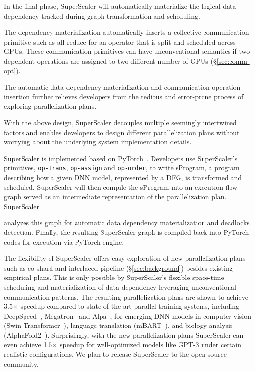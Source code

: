 In the final phase, {SuperScaler} will automatically materialize the logical data dependency tracked during graph transformation and scheduling. 

The dependency materialization automatically inserts a collective communication primitive such as all-reduce for an operator that is split and scheduled across GPUs. These communication primitives can have unconventional semantics if two dependent operations are assigned to two different number of GPUs (\S\ref{sec:comm-opt}).

The automatic data dependency materialization and communication operation insertion further relieves developers from the tedious and error-prone process of exploring parallelization plans. 

With the above design, {SuperScaler} decouples multiple seemingly intertwined factors and enables developers to design different parallelization plans without worrying about the underlying system implementation details.

{SuperScaler} is implemented based on PyTorch~\cite{PyTorch}. Developers use {SuperScaler}'s primitives, \texttt{op-trans}, \texttt{op-assign} and \texttt{op-order}, to write {sProgram}, a program describing how a given DNN model, represented by a DFG, is transformed and scheduled. {SuperScaler} will then compile the {sProgram} into an execution flow graph served as an intermediate representation of the parallelization plan. {SuperScaler} 

analyzes this graph for automatic data dependency materialization and deadlocks detection. Finally, the resulting {SuperScaler} graph is compiled back into PyTorch codes for execution via PyTorch engine. 

The flexibility of {SuperScaler} offers easy exploration of new parallelization plans such as {co-shard} and interlaced pipeline (\S\ref{sec:background}) besides existing empirical plans. This is only possible by {SuperScaler}'s flexible space-time scheduling and materialization of data dependency leveraging unconventional communication patterns. The resulting parallelization plans are shown to achieve 3.5$\times$ speedup compared to state-of-the-art parallel training systems, including DeepSpeed~\cite{deepspeed}, Megatron~\cite{megatron2} and Alpa~\cite{alpa}, for emerging DNN models in computer vision (Swin-Transformer~\cite{swin-v2}), language translation (mBART~\cite{mbart}), and biology analysis (AlphaFold2~\cite{alphafold}). Surprisingly, with the new parallelization plans {SuperScaler} can even achieve 1.5$\times$ speedup for well-optimized models like GPT-3 under certain realistic configurations. We plan to release {SuperScaler} to the open-source community.

